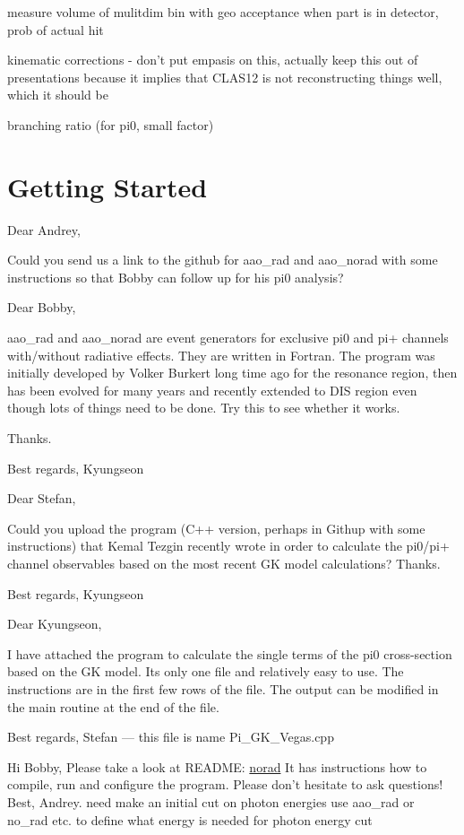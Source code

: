 measure volume of mulitdim bin with geo acceptance
when part is in detector, prob of actual hit


kinematic corrections - don't put empasis on this, actually keep this out of presentations because it implies that CLAS12 is not reconstructing things well, which it should be

branching ratio (for pi0, small factor)





\section{Getting Started}
    Dear Andrey,
    
    Could you send us a link to the github for aao\_rad and aao\_norad with some instructions so that Bobby can follow up for his pi0 analysis?  
    
    Dear Bobby,
    
    aao\_rad and aao\_norad are event generators for exclusive pi0 and pi+ channels with/without radiative effects.  They are written in Fortran.  The program was initially developed by Volker Burkert long time ago for the resonance region, then has been evolved for many years and recently extended to DIS region even though lots of things need to be done.  Try this to see whether it works.  
    
    Thanks.
    
    Best regards, Kyungseon
    
    
    Dear Stefan,
    
    Could you upload the program (C++ version, perhaps in Githup with some instructions) that Kemal Tezgin recently wrote in order to calculate the pi0/pi+ channel observables based on the most recent GK model calculations?  Thanks.
    
    Best regards, Kyungseon
    
    
    Dear Kyungseon,
    
    I have attached the program to calculate the single terms of the pi0 
    cross-section based on the GK model.
    Its only one file and relatively easy to use. The instructions are in 
    the first few rows of the file.
    The output can be modified in the main routine at the end of the file.
    
    Best regards,
    Stefan --- this file is name Pi\_GK\_Vegas.cpp
    
    
    Hi Bobby,
    Please take a look at README:
    \href{https://github.com/drewkenjo/aao\_norad}{norad}
    It has instructions how to compile, run and configure the program.
    Please don't hesitate to ask questions!
    Best,
    Andrey.
    need make an initial cut on photon energies
use aao\_rad or no\_rad etc. to define what energy is needed for photon energy cut

